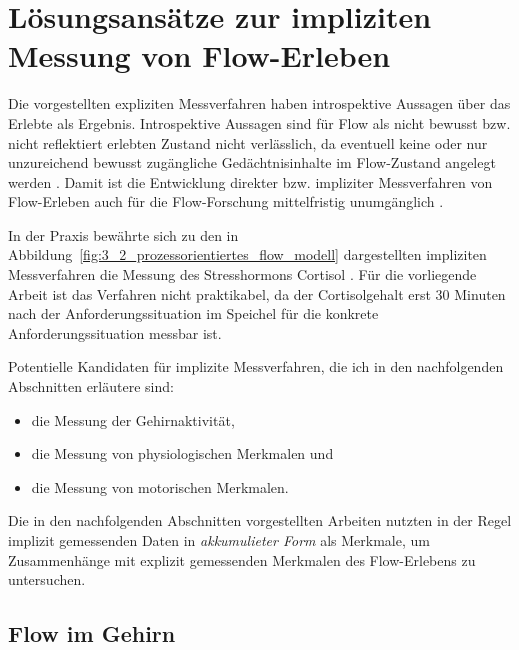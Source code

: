 

\section{Lösungsansätze zur impliziten Messung von Flow-Erleben} 

\label{sec:losungsansatze_zur_impliziten_messung_von_flow_erleben}

Die vorgestellten expliziten Messverfahren haben introspektive Aussagen über das Erlebte als Ergebnis. Introspektive Aussagen sind für Flow als nicht bewusst bzw. nicht reflektiert erlebten Zustand nicht verlässlich, da eventuell keine oder nur unzureichend bewusst zugängliche Gedächtnisinhalte im Flow-Zustand angelegt werden \citep[][S.~82]{Henk2014}. Damit ist die Entwicklung direkter bzw. impliziter Messverfahren von Flow-Erleben auch für die Flow-Forschung mittelfristig unumgänglich \citep[][S.~86]{Henk2014}.

In der Praxis bewährte sich zu den in Abbildung~\ref{fig:3_2_prozessorientiertes_flow_modell} dargestellten impliziten Messverfahren die Messung des Stresshormons Cortisol \citep{Keller2011, Peifer2014, Peifer2015}. Für die vorliegende Arbeit ist das Verfahren nicht praktikabel, da der Cortisolgehalt erst 30 Minuten nach der Anforderungssituation im Speichel für die konkrete Anforderungssituation messbar ist. 

Potentielle Kandidaten für implizite Messverfahren, die ich in den nachfolgenden Abschnitten erläutere sind: 
\begin{itemize}
	
	\item die Messung der Gehirnaktivität,
	
	\item die Messung von physiologischen Merkmalen und
	
	\item die Messung von motorischen Merkmalen. 
\end{itemize}

Die in den nachfolgenden Abschnitten vorgestellten Arbeiten nutzten in der Regel implizit gemessenden Daten in \emph{akkumulieter Form} als Merkmale, um Zusammenhänge mit explizit gemessenden Merkmalen des Flow-Erlebens zu untersuchen.

\subsection{Flow im Gehirn} 

